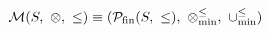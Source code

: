 \[
\mathcal{M}(S,\ \otimes,\ \leq) \equiv (\mathcal{P}_{\mathrm{fin}}(S,\ \leq),\ \minlift,\ \minunion)
\]

